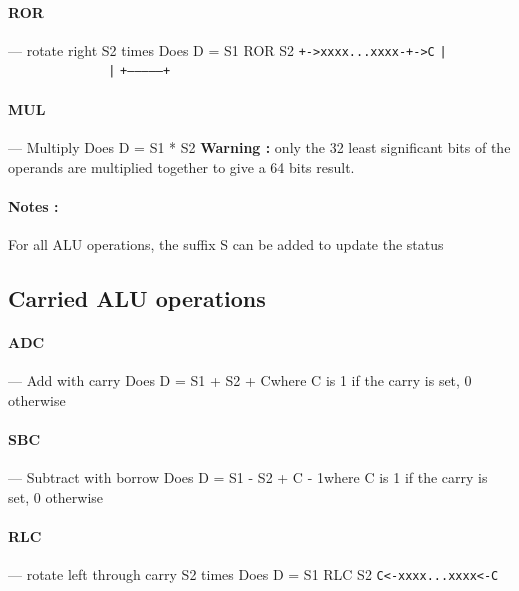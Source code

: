 \documentclass[11pt]{article}
\begin{document}
\paragraph{ROR} --- rotate right S2 times\newline
Does \newline D = S1 ROR S2\newline
\texttt{+->xxxx...xxxx-+->C}\newline
\texttt{|~~~~~~~~~~~~~~|}\newline
\texttt{+--------------+}

\paragraph{MUL} --- Multiply\newline
Does \newline D = S1 * S2 \newline
\textbf{Warning : } only the 32 least significant bits of the operands 
are multiplied together to give a 64 bits result. 

\paragraph{Notes : }
For all ALU operations, the suffix S can be added to update the status

\subsection{Carried ALU operations}

\paragraph{ADC} --- Add with carry\newline
Does \newline D = S1 + S2 + C\newline  where C is 1 if the carry is set, 0 otherwise

\paragraph{SBC} --- Subtract with borrow\newline
Does \newline D = S1 - S2 + C - 1\newline  where C is 1 if the carry is set, 0 otherwise

\paragraph{RLC} --- rotate left through carry S2 times\newline
Does \newline D = S1 RLC S2\newline
\texttt{C<-xxxx...xxxx<-C}
\end{document}
